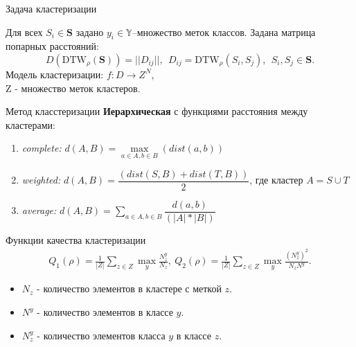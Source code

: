 \documentclass{beamer}
\begin{document}
\begin{frame}

    \begin{block}{Задача кластеризации}

        Для всех $S_i \in \boldsymbol{S}$ задано ${y_i \in \mathbb{Y}}$\---множество меток классов.
        Задана матрица попарных расстояний:
        $$D(\text{DTW}_\rho(\boldsymbol{S})) = ||D_{ij}||, \ \ D_{ij} = \text{DTW}_\rho(S_i, S_j),\ \ S_i, S_j \in \boldsymbol{S}.$$
        Модель кластеризации: $f: D \rightarrow Z^N$,\\ Z \-- множество меток кластеров.

    \end{block}

    \begin{block}{Метод класстеризации}
        \textbf{Иерархическая} с функциями расстояния между кластерами: 
        \begin{enumerate}
            \item \textit{complete:}  $d(A, B) = \max\limits_{a \in A, b \in B}(dist(a, b))$ 
            \item \textit{weighted:}  $d(A,B) = \dfrac{(dist(S,B) + dist(T,B))}{2}$, где кластер $A = S \cup T$
            \item \textit{average:}   $d(A,B) = \sum\limits_{a \in A, b \in B} \dfrac{d(a, b)}{(|A|*|B|)}$ 
        \end{enumerate} 
    \end{block}
\end{frame}

\begin{frame}
    \begin{block}{Функции качества кластеризации}
        \begin{align*}
            Q_1(\rho) = \frac{1}{|Z|}\sum\limits_{z \in Z} \max_y \frac{N_z^y}{N_z},\  Q_2(\rho) = \frac{1}{|Z|}\sum\limits_{z \in Z} \max_y \frac{(N_z^y)^2}{N_z N^y}.
        \end{align*}
        \begin{itemize}
            \item $N_z$ \-- количество элементов в кластере с меткой $z$. 
            \item $N^y$ \-- количество элементов в классе $y$.
            \item $N_z^y$ \-- количество элементов класса $y$ в классе $z$.
        \end{itemize}
    \end{block}
\end{frame}
\end{document}
